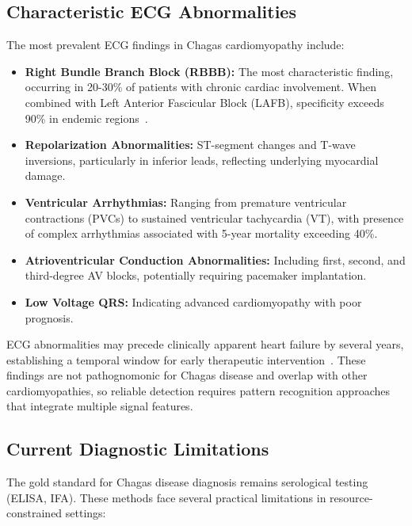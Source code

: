 \subsection{Characteristic ECG Abnormalities}

The most prevalent ECG findings in Chagas cardiomyopathy include:

\begin{itemize}
    \item \textbf{Right Bundle Branch Block (RBBB):} The most characteristic finding, occurring in 20-30\% of patients with chronic cardiac involvement. When combined with Left Anterior Fascicular Block (LAFB), specificity exceeds 90\% in endemic regions~\cite{nunes2018chagas}.

    \item \textbf{Repolarization Abnormalities:} ST-segment changes and T-wave inversions, particularly in inferior leads, reflecting underlying myocardial damage.

    \item \textbf{Ventricular Arrhythmias:} Ranging from premature ventricular contractions (PVCs) to sustained ventricular tachycardia (VT), with presence of complex arrhythmias associated with 5-year mortality exceeding 40\%.

    \item \textbf{Atrioventricular Conduction Abnormalities:} Including first, second, and third-degree AV blocks, potentially requiring pacemaker implantation.

    \item \textbf{Low Voltage QRS:} Indicating advanced cardiomyopathy with poor prognosis.
\end{itemize}

ECG abnormalities may precede clinically apparent heart failure by several years, establishing a temporal window for early therapeutic intervention~\cite{nunes2018chagas}. These findings are not pathognomonic for Chagas disease and overlap with other cardiomyopathies, so reliable detection requires pattern recognition approaches that integrate multiple signal features.

\subsection{Current Diagnostic Limitations}

The gold standard for Chagas disease diagnosis remains serological testing (ELISA, IFA). These methods face several practical limitations in resource-constrained settings:


